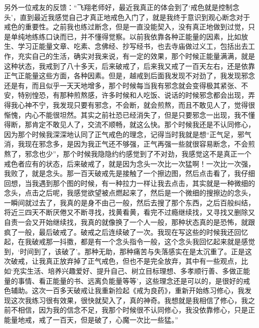 另外一位戒友的反馈：“飞翔老师好，最近我真正的体会到了‘戒色就是控制念头’，直到最近我感觉自己才真正地戒色入门了，就是我终于意识到观心断念对于戒色的重要性。之前我也练过断念，但是一直没能契入，没有真正地做到过觉，只是单纯地练练口诀而已，并不懂得觉察。以前我依靠各种正能量的因素，比如放生、学习正能量文章、吃素、念佛经、抄写经书，也去寺庙做过义工，包括出去工作，充实自己的生活，确实对我来说，有一定的效果，那个时候正能量满满，就是这种状态，我戒到了八十多天，后来破戒了，后来我又戒了一百天左右，还是依靠正气正能量这些方面，各种因素。但是，越戒到后面我发现不对劲了，我发现邪念还是有，而且似乎一天天地增多，那个时候每当我有邪念就会变得极其紧张、不安，特别惶恐，有那种煎熬感，许多时候和人吃饭、说话的时候邪念都会出现，弄得我心神不宁，我发现只要有邪念，不会断，就会煎熬，而且不敢见人了，觉得很惭愧，内心不能很坦然。其实之前社恐已经消失了，但是只要邪念一出现，我不懂得断，那肯定不敢见人了，交流不顺畅，就这么快。那个时候我还是不认同修心，因为那个时候我深深地认同了正气戒色的理念，记得当时我就是想“正气足，邪气消，我现在邪念多，是因为我正气还不够强，正气再强一些就很容易断念，不会煎熬了，邪念也少”，那个时候我隐隐约约感觉到了不对劲，我感觉这不是真正一个戒色者应有的状态，后来破戒了，就是因为念头一次比一次猛啊！一次比一次强，我败了，就是念头。那一百天破戒先是接触了一个擦边图，然后点击看了，我仔细回想，当我遇到那个图的时候，有一种拉力一样让我去点击，其实就是一种微细的念头，点击之后呢，我感觉欲望被点燃起来了，然后是一个微细的搜擦边的念头，一瞬间就过去了，我真的是身不由己一般，然后去搜了那个东西，之后百般纠结，将近三四天不断厌倦又不断寻找，找黄看黄，看完不过瘾继续找，又寻找又删除又自责一会又开始继续找，我真的就像换了一个人一般，那种状态真的是恐怖，就跟疯了一般，最后破戒了。破戒之后连续破了一次。我现在写这些的时候我还回忆起，在我破戒那一抖擞，都是有一个念头指令一般，这个念头我回忆起来就是感觉到，‘时间到了，该破了’。那种无助，那种痛苦与失落感实在是太沉重了。正是这次破戒，让我真正放弃掉了正气戒色，但也不是完全放弃，其中有一些观点，比如‘充实生活、培养兴趣爱好、提升自己、树立目标理想、多孝顺行善、多做正能量的事情、看正能量的书、远离负能量等等’，这些理念还是可以的，是很好的戒色辅助。这次一百多天破戒让我重新捡起《戒为良药》，重新开始练习修心，我发现这次我练习很有效果，很快就契入了，真的神奇。我想就是我相信了修心，我之前不相信，因为我的信念不足，我那个时候很不认同修心，我没依靠修心，只是正能量地戒，戒了一百天，但是破了，心魔一次比一些猛。”

